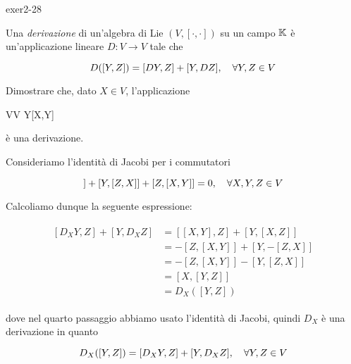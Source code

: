 
{exer2-28}
{
Una \textit{derivazione} di un'algebra di Lie $ (V,[\cdot,\cdot]) $ su un campo $ \mathbb{K} $ è un'applicazione lineare $ D : V \to V $ tale che

\begin{equation}
	D([Y,Z]) = [DY,Z] + [Y,DZ] \qcomma \forall Y,Z \in V
\end{equation}

Dimostrare che, dato $ X \in V $, l'applicazione

	{V}{V}
	{Y}{[X,Y]}

è una derivazione.
}
{
Consideriamo l'identità di Jacobi per i commutatori

\begin{equation}
	[X,[Y,Z]] + [Y,[Z,X]] + [Z,[X,Y]] = 0 \qcomma \forall X,Y,Z \in V
\end{equation}

Calcoliamo dunque la seguente espressione:

\begin{align}
	\begin{split}
		[D_{X} Y,Z] + [Y,D_{X} Z] &= [[X,Y],Z] + [Y,[X,Z]] \\
		&= - [Z,[X,Y]] + [Y,-[Z,X]] \\
		&= - [Z,[X,Y]] - [Y,[Z,X]] \\
		&= [X,[Y,Z]] \\
		&= D_{X}([Y,Z])
	\end{split}
\end{align}

dove nel quarto passaggio abbiamo usato l'identità di Jacobi, quindi $ D_{X} $ è una derivazione in quanto

\begin{equation}
	D_{X}([Y,Z]) = [D_{X} Y,Z] + [Y,D_{X} Z] \qcomma \forall Y,Z \in V
\end{equation}
}


